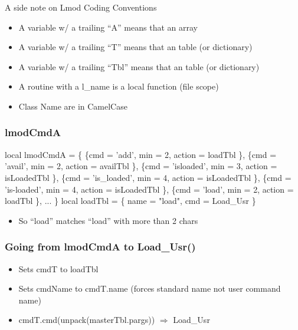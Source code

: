 \documentclass{beamer}
\begin{document}
\begin{frame}{A side note on Lmod Coding Conventions}
  \begin{itemize}
    \item A variable w/ a trailing ``A'' means that an array
    \item A variable w/ a trailing ``T'' means that an table (or dictionary)
    \item A variable w/ a trailing ``Tbl'' means that an table (or dictionary)
    \item A routine with a l_name is a local function (file scope)
    \item Class Name are in CamelCase
  \end{itemize}
\end{frame}

\begin{frame}[fragile]
    \frametitle{lmodCmdA}
 {\small
   \begin{semiverbatim}
   local lmodCmdA = \{
      \{cmd = 'add',          min = 2, action = loadTbl     \},
      \{cmd = 'avail',        min = 2, action = availTbl    \},
      \{cmd = 'isloaded',     min = 3, action = isLoadedTbl \},
      \{cmd = 'is_loaded',    min = 4, action = isLoadedTbl \},
      \{cmd = 'is-loaded',    min = 4, action = isLoadedTbl \},
      \{cmd = 'load',         min = 2, action = loadTbl     \},
      ...
   \}
   local loadTbl      = \{ name = "load", cmd = Load_Usr    \}
    \end{semiverbatim}
  \begin{itemize}
    \item So ``load'' matches ``load'' with more than 2 chars
  \end{itemize}
}
\end{frame}

\begin{frame}[fragile]
    \frametitle{Going from lmodCmdA to Load\_Usr()}
  \begin{itemize}
    \item Sets cmdT to loadTbl
    \item Sets cmdName to cmdT.name (forces standard name not user
      command name)
    \item cmdT.cmd(unpack(masterTbl.pargs)) $\Rightarrow$ Load\_Usr
  \end{itemize}

\end{frame}
\end{document}
